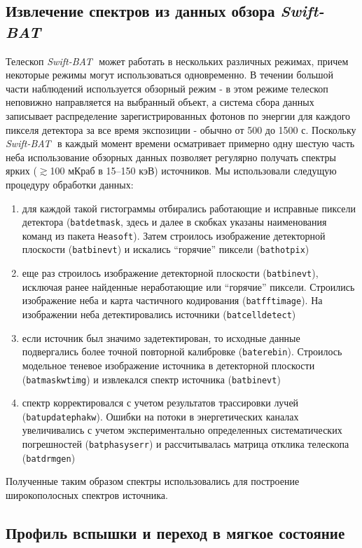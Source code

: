 \documentclass{pazhb}
\def\swiftb{{\em Swift-BAT\,}}
\begin{document}
\subsection{Извлечение спектров из данных обзора \swiftb}	
Телескоп \swiftb\, может работать в нескольких различных режимах, причем некоторые режимы могут использоваться одновременно. В течении большой части наблюдений используется обзорный режим - в этом режиме телескоп неповижно направляется на выбранный объект, а система сбора данных записывает распределение зарегистрированных фотонов по энергии для каждого пикселя детектора за все время экспозиции - обычно от 500 до 1500 с. Поскольку \swiftb\, в каждый момент времени осматривает примерно одну шестую часть неба использование обзорных данных позволяет регулярно получать спектры ярких ($\gtrsim$100 мКраб в 15--150 кэВ) источников.
Мы использовали следущую процедуру обработки данных:
\begin{enumerate}
\item    для каждой такой гистограммы отбирались работающие и исправные пиксели детектора (\texttt{batdetmask}, здесь и далее в скобках указаны наименования команд из пакета \texttt{Heasoft}). Затем строилось изображение детекторной плоскости (\texttt{batbinevt})  и искались ``горячие'' пиксели (\texttt{bathotpix})
\item   еще раз строилось изображение детекторной плоскости (\texttt{batbinevt}), исключая ранее найденные неработающие или ``горячие'' пиксели. Строились изображение неба и карта частичного кодирования (\texttt{batfftimage}). На изображении неба детектировались источники (\texttt{batcelldetect})
\item если источник был значимо задетектирован, то исходные данные подвергались более точной повторной калибровке (\texttt{baterebin}). Строилось модельное теневое изображение источника в детекторной плоскости  (\texttt{batmaskwtimg}) и извлекался спектр источника (\texttt{batbinevt})
\item спектр корректировался с учетом результатов трассировки лучей (\texttt{batupdatephakw}). Ошибки на потоки в энергетических каналах увеличивались с учетом экспериментально определенных систематических погрешностей (\texttt{batphasyserr}) и рассчитывалась матрица отклика телескопа (\texttt{batdrmgen})
\end{enumerate}    

Полученные таким образом спектры использовались для построение широкополосных спектров источника.

\subsection{Профиль вспышки и переход в мягкое состояние}	
\end{document}
